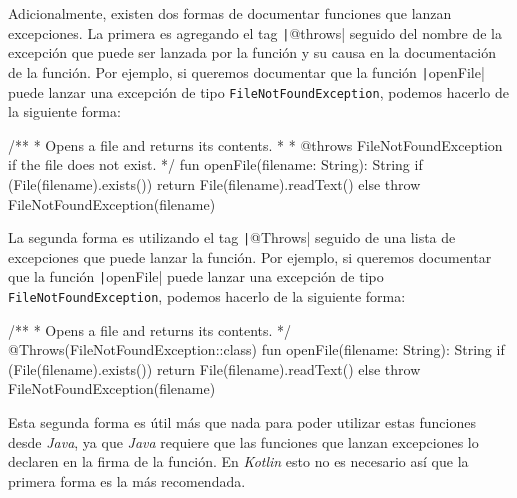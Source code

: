   Adicionalmente, existen dos formas de documentar funciones que lanzan excepciones.
  La primera es agregando el tag \texttt|@throws| seguido del nombre de la excepción
  que puede ser lanzada por la función y su causa en la documentación de la función.
  Por ejemplo, si queremos documentar que la función \texttt|openFile| puede lanzar
  una excepción de tipo \texttt{FileNotFoundException}, podemos hacerlo de la siguiente forma:

  \begin{kotlin}
    /**
     * Opens a file and returns its contents.
     *
     * @throws FileNotFoundException if the file does not exist.
     */
    fun openFile(filename: String): String {
      if (File(filename).exists()) {
        return File(filename).readText()
      } else {
        throw FileNotFoundException(filename)
      }
    }
  \end{kotlin}

  La segunda forma es utilizando el tag \texttt|@Throws| seguido de una lista de
  excepciones que puede lanzar la función.
  Por ejemplo, si queremos documentar que la función \texttt|openFile| puede lanzar
  una excepción de tipo \texttt{FileNotFoundException}, podemos hacerlo de la siguiente forma:

  \begin{kotlin}
    /**
     * Opens a file and returns its contents.
     */
    @Throws(FileNotFoundException::class)
    fun openFile(filename: String): String {
      if (File(filename).exists()) {
        return File(filename).readText()
      } else {
        throw FileNotFoundException(filename)
      }
    }
  \end{kotlin}

  Esta segunda forma es útil más que nada para poder utilizar estas funciones desde \textit{Java}, 
  ya que \textit{Java} requiere que las funciones que lanzan excepciones lo declaren en la firma
  de la función.
  En \textit{Kotlin} esto no es necesario así que la primera forma es la más recomendada.
  